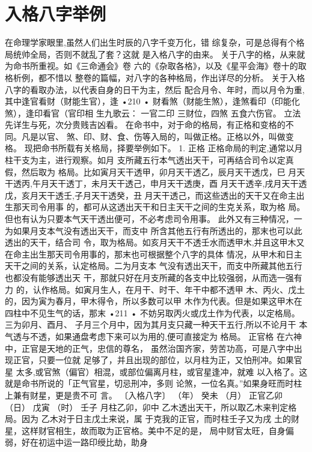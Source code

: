 \section{入格八字举例}
在命理学家眼里,虽然人们出生时辰的八字千变万化，错
综复杂，可是总得有个格局统帅全局，否则不就乱了套？这就
是入格八字的由来。
关于八字的格，从来就为命书所重视。如《三命通会》卷
六的《杂取各格》，以及《星平会海》卷十的取格析例，都不惜以
整卷的篇幅，对八字的各种格局，作出详尽的分析。
关于入格八字的看取办法，以代表自身的日干为主，然后
配合月令、年时，而以月令为重,其中逢官看财（财能生官），逢
•210 •
财看煞（财能生煞），逢煞看印（印能化煞），逢印看官（官印相
生九歌云：
一官二印 三财位，四煞 五食六伤官。
立法先详生与死，次分贵贱吉凶看。
在命书中，对于命的格局，有正格和变格的不同。凡是以官、
煞、印、财、食、伤等入局的，叫做正格。正格以外，叫做变格。
现把命书所载有关格局，择要举例如下。
1. 正格
正格命局的判定,通常以月柱干支为主，进行观察。如月
支所藏五行本气透出天干，可再结合司令以定真假，然后取为
格局。比如寅月天干透甲，卯月天干透乙，辰月天干透戊，巳
月天干透丙,午月天干透丁，未月天干透己，申月天干透庚，酉
月天干透辛,戌月天干透戊，亥月天干透壬,子月天干透癸，丑
月天干透己，而这些透出的天干又在命主出生那天司令用事
的，都可从这透出天干和日主天干之间的生克关系，取为格
局。但也有认为只要本气天干透出便可，不必考虑司令用事。
此外又有三种情况，一为如果月支本气没有透出天干，而支中
所含其他五行有所透出的，那末也可以此透出的天干，结合司
令，取为格局。如亥月天干不透壬水而透甲木,并且这甲木又
在命主出生那天司令用事的，那末也可根据整个八字的具体
情况，从甲木和日主天干之间的关系，认定格局。二为月支本
气没有透出天干，而支中所藏其他五行也都没有能够透出天
干，那就只好在月支所藏的各支中比较强弱，从而选一强有力
的，认作格局。如寅月生人，在月干、时干、年干中都不透甲
木、丙火、戊土的，因为寅为春月，甲木得令，所以多数可以甲
木作为代表。但是如果这甲木在四柱中不见生气的话，那末
•211 •
不妨另取丙火或戊土作为代表，以定格局。三为卯月、酉月、
子月三个月中，因为其月支只藏一种天干五行,所以不论月干
本气透与不透，如果通盘考虑下来可以为用的,便可直接定为
格局。
正官格 在六神中，正官是天地的正气，忠信的尊名，
虽然治国齐家，劳苦功高，可是八字中出现正官，只要一位就
足够了，并且出现的部位，以月柱为正，又怕刑冲。如果官星
太多,或官煞（偏官）相混，或部位偏离月柱，或官星逢冲，就难
以入格了。这就是命书所说的「正气官星，切忌刑冲，多则
论煞，一位名真。”如果身旺而时柱上兼有财星，更是贵不可
言。
〔入格八字〕
（年） 癸未
（月） 正官乙卯
（日） 戊寅
（时） 壬子
月柱乙卯，卯中 乙木透出天干，所以取乙木来判定格局。因为
乙木对于日主戊土来说，属 于克我的正官，而时柱壬子又为戌
土的财星，这样财官相生，故而取为正官格。美中不足的是，
局中财官太旺，自身偏弱，好在初运中运一路印绶比劫，助身
